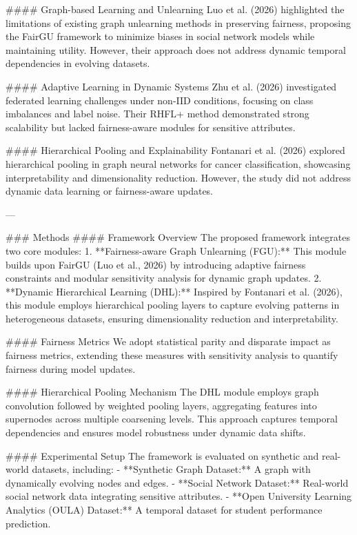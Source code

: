#### Graph-based Learning and Unlearning  
Luo et al. (2026) highlighted the limitations of existing graph unlearning methods in preserving fairness, proposing the FairGU framework to minimize biases in social network models while maintaining utility. However, their approach does not address dynamic temporal dependencies in evolving datasets.

#### Adaptive Learning in Dynamic Systems  
Zhu et al. (2026) investigated federated learning challenges under non-IID conditions, focusing on class imbalances and label noise. Their RHFL+ method demonstrated strong scalability but lacked fairness-aware modules for sensitive attributes.

#### Hierarchical Pooling and Explainability  
Fontanari et al. (2026) explored hierarchical pooling in graph neural networks for cancer classification, showcasing interpretability and dimensionality reduction. However, the study did not address dynamic data learning or fairness-aware updates.

---

### Methods  
#### Framework Overview  
The proposed framework integrates two core modules:  
1. **Fairness-aware Graph Unlearning (FGU):** This module builds upon FairGU (Luo et al., 2026) by introducing adaptive fairness constraints and modular sensitivity analysis for dynamic graph updates.  
2. **Dynamic Hierarchical Learning (DHL):** Inspired by Fontanari et al. (2026), this module employs hierarchical pooling layers to capture evolving patterns in heterogeneous datasets, ensuring dimensionality reduction and interpretability.  

#### Fairness Metrics  
We adopt statistical parity and disparate impact as fairness metrics, extending these measures with sensitivity analysis to quantify fairness during model updates.  

#### Hierarchical Pooling Mechanism  
The DHL module employs graph convolution followed by weighted pooling layers, aggregating features into supernodes across multiple coarsening levels. This approach captures temporal dependencies and ensures model robustness under dynamic data shifts.  

#### Experimental Setup  
The framework is evaluated on synthetic and real-world datasets, including:  
- **Synthetic Graph Dataset:** A graph with dynamically evolving nodes and edges.  
- **Social Network Dataset:** Real-world social network data integrating sensitive attributes.  
- **Open University Learning Analytics (OULA) Dataset:** A temporal dataset for student performance prediction.  

